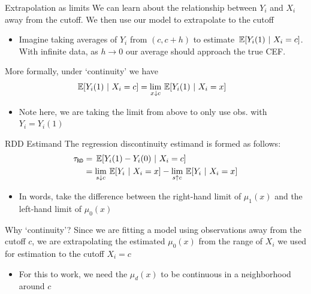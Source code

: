 \documentclass[aspectratio=169,t,11pt,table]{beamer}
\begin{document}
\begin{frame}{Extrapolation as limits}
  We can learn about the relationship between $Y_i$ and $X_i$ away from the cutoff. We then use our model to \alert{extrapolate} to the cutoff
  \begin{itemize}
    \item Imagine taking averages of $Y_i$ from $(c, c+h)$ to estimate $\expec{Y_i(1)}{X_i = c}$. With infinite data, as $h \to 0$ our average should approach the true CEF.
  \end{itemize}
  
  \bigskip
  More formally, under `continuity' we have
  \begin{align*}
    \expec{Y_i(1)}{X_i = c} 
    &= \lim_{x \downarrow c} \expec{Y_i(1)}{X_i = x}
  \end{align*}
  \begin{itemize}
    \item Note here, we are taking the limit from above to only use obs. with $Y_i = Y_i(1)$
  \end{itemize}
\end{frame}

\begin{frame}{RDD Estimand}
  The \alert{regression discontinuity} estimand is formed as follows:
  \begin{align*}
    \tau_{\texttt{RD}} &= 
    \expec{Y_i(1) - Y_i(0)}{X_i = c} \\
    &= \lim_{s\downarrow c} \expec{Y_i}{X_i = x} - \lim_{s \uparrow c} \expec{Y_i}{X_i = x} 
  \end{align*}

  \begin{itemize}
    \item In words, take the difference between the right-hand limit of $\mu_1(x)$ and the left-hand limit of $\mu_0(x)$
  \end{itemize}
\end{frame}

\begin{frame}{Why `continuity'?}
  Since we are fitting a model using observations away from the cutoff $c$, we are \alert{extrapolating} the estimated $\mu_0(x)$ from the range of $X_i$ we used for estimation to the cutoff $X_i = c$
  \begin{itemize}
    \item For this to work, we need the $\mu_d(x)$ to be continuous in a neighborhood around $c$
  \end{itemize}
\end{frame}
\end{document}
